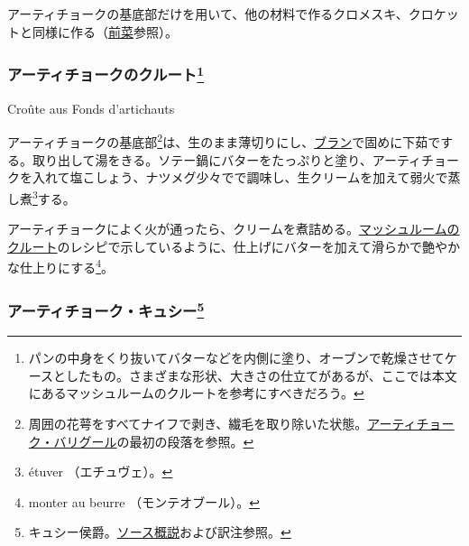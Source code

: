 \begin{recette}
アーティチョークの基底部だけを用いて、他の材料で作るクロメスキ、クロケットと同様に作る（\protect\hyperlink{croquettes}{前菜}参照）。

\atoaki{}

\hypertarget{croute-aux-fonds-d-artichauts}{%
\subsubsection[アーティチョークのクルート]{\texorpdfstring{アーティチョークのクルート\footnote{パンの中身をくり抜いてバターなどを内側に塗り、オーブンで乾燥させてケースとしたもの。さまざまな形状、大きさの仕立てがあるが、ここでは本文にあるマッシュルームのクルートを参考にすべきだろう。}}{アーティチョークのクルート}}\label{croute-aux-fonds-d-artichauts}}

\begin{frsubenv}

Croûte aus Fonds d'artichauts

\end{frsubenv}


アーティチョークの基底部\footnote{周囲の花萼をすべてナイフで剥き、繊毛を取り除いた状態。\protect\hyperlink{artichaut-a-la-barigoule}{アーティチョーク・バリグール}の最初の段落を参照。}は、生のまま薄切りにし、\protect\hyperlink{blanc-pour-viandes-et-certains-legumes}{ブラン}で固めに下茹でする。取り出して湯をきる。ソテー鍋にバターをたっぷりと塗り、アーティチョークを入れて塩こしょう、ナツメグ少々でで調味し、生クリームを加えて弱火で蒸し煮\footnote{étuver
  （エチュヴェ）。}する。

アーティチョークによく火が通ったら、クリームを煮詰める。\protect\hyperlink{croute-aux-champignons}{マッシュルームのクルート}のレシピで示しているように、仕上げにバターを加えて滑らかで艶やかな仕上りにする\footnote{monter
  au beurre （モンテオブール）。}。

\atoaki{}

\hypertarget{fonds-d-artichauts-cussy}{%
\subsubsection[アーティチョーク・キュシー]{\texorpdfstring{アーティチョーク・キュシー\footnote{キュシー侯爵。\protect\hyperlink{osbservation-sur-la-sauce}{ソース概説}および訳注参照。}}{アーティチョーク・キュシー}}\label{fonds-d-artichauts-cussy}}


\end{recette}
